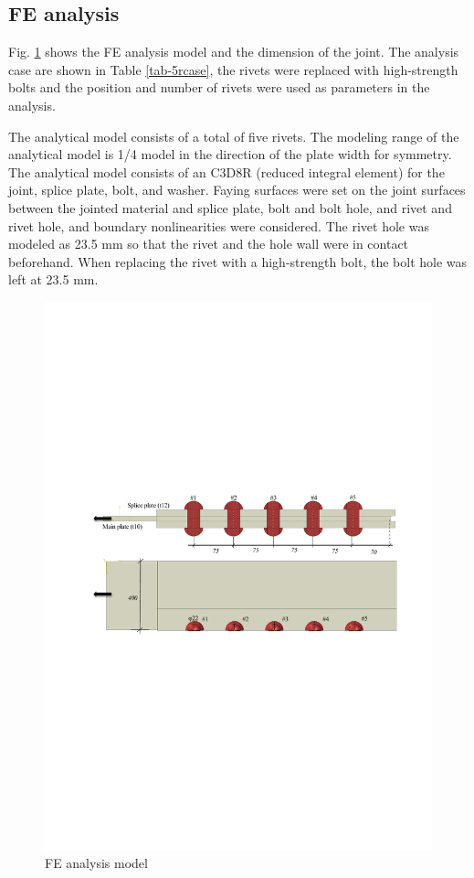 \subsection{FE analysis}

Fig. \ref{fig-femodl-5r} shows the FE analysis model and the dimension of the joint. The analysis case are shown in Table \ref{tab-5rcase}, the rivets were replaced with high-strength bolts and the position and number of rivets were used as parameters in the analysis.

The analytical model consists of a total of five rivets. The modeling range of the analytical model is 1/4 model in the direction of the plate width for symmetry. The analytical model consists of an C3D8R (reduced integral element) for the joint, splice plate, bolt, and washer. Faying surfaces were set on the joint surfaces between the jointed material and splice plate, bolt and bolt hole, and rivet and rivet hole, and boundary nonlinearities were considered. The rivet hole was modeled as 23.5 mm so that the rivet and the hole wall were in contact beforehand. When replacing the rivet with a high-strength bolt, the bolt hole was left at 23.5 mm.

\begin{figure}
    \centering
    \includegraphics[width=0.9\linewidth]{imgs//ch4/fig-femodl-5r.pdf}
    \caption{FE analysis model}
    \label{fig-femodl-5r}
\end{figure}

